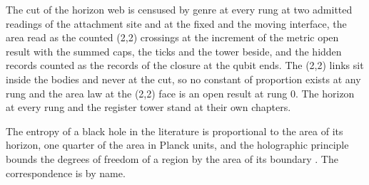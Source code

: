 The cut of the horizon web is censused by genre at every rung at two admitted readings of the attachment site and at the fixed and the moving interface, the area read as the counted (2,2) crossings at the increment of the metric open result with the summed caps, the ticks and the tower beside, and the hidden records counted as the records of the closure at the qubit ends. The (2,2) links sit inside the bodies and never at the cut, so no constant of proportion exists at any rung and the area law at the (2,2) face is an open result at rung 0. The horizon at every rung and the register tower stand at their own chapters.
\begin{chbridge}
The entropy of a black hole in the literature is proportional to the area of its horizon, one quarter of the area in Planck units, and the holographic principle bounds the degrees of freedom of a region by the area of its boundary \cite{Bekenstein1973,Hawking1975,Bousso2002}. The correspondence is by name.
\end{chbridge}
